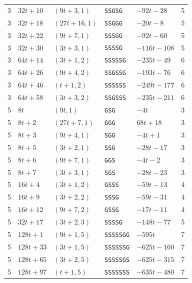 \begin{longtable}{rllllr}
3&$32t+10$&$(9t+3,1)$&\texttt{SSGSG}&$-92t-28$&5\\
3&$32t+18$&$(27t+16,1)$&\texttt{SSGGG}&$-20t-8$&5\\
3&$32t+22$&$(9t+7,1)$&\texttt{SSSGG}&$-92t-60$&5\\
3&$32t+30$&$(3t+3,1)$&\texttt{SSSSG}&$-116t-108$&5\\
3&$64t+14$&$(3t+1,2)$&\texttt{SSSSSG}&$-235t-49$&6\\
3&$64t+26$&$(9t+4,2)$&\texttt{SSGSSG}&$-193t-76$&6\\
3&$64t+46$&$(t+1,2)$&\texttt{SSSSSS}&$-249t-177$&6\\
3&$64t+58$&$(3t+3,2)$&\texttt{SSGSSS}&$-235t-211$&6\\
5&$8t$&$(9t,1)$&\texttt{GSG}&$-4t$&3\\
5&$8t+2$&$(27t+7,1)$&\texttt{GGG}&$68t+18$&3\\
5&$8t+3$&$(9t+4,1)$&\texttt{SGG}&$-4t+1$&3\\
5&$8t+5$&$(3t+2,1)$&\texttt{SSG}&$-28t-17$&3\\
5&$8t+6$&$(9t+7,1)$&\texttt{GGS}&$-4t-2$&3\\
5&$8t+7$&$(3t+3,1)$&\texttt{SGS}&$-28t-23$&3\\
5&$16t+4$&$(3t+1,2)$&\texttt{GSSS}&$-59t-13$&4\\
5&$16t+9$&$(3t+2,2)$&\texttt{SSSG}&$-59t-31$&4\\
5&$16t+12$&$(9t+7,2)$&\texttt{GSSG}&$-17t-11$&4\\
5&$32t+17$&$(3t+2,3)$&\texttt{SSSSG}&$-148t-77$&5\\
5&$128t+1$&$(9t+1,5)$&\texttt{SSSSSGG}&$-595t$&7\\
5&$128t+33$&$(3t+1,5)$&\texttt{SSSSSSG}&$-625t-160$&7\\
5&$128t+65$&$(3t+2,5)$&\texttt{SSSSSGS}&$-625t-315$&7\\
5&$128t+97$&$(t+1,5)$&\texttt{SSSSSSS}&$-635t-480$&7\\
\end{longtable}
\endgroup
